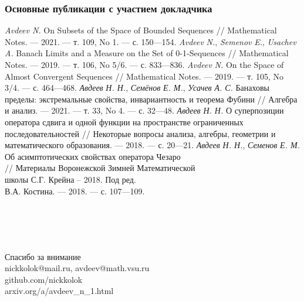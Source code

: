 \documentclass[10pt,pdf,hyperref={unicode},aspectratio=169,color={usenames, dvipsnames}]{beamer}\usepackage{amsmath}
\theoremstyle{definition}
\begin{document}
\begin{frame}
	\frametitle{Основные публикации с участием докладчика}
	\vspace{-1.2em}
	\hfill
	\begin{varwidth}[t]{0.95\linewidth}
	\setlength\itemsep{0pt}
	\begin{thebibliography}{99}
		\setlength{\parskip}{0pt}%
		\setlength{\itemsep}{0pt}
		{}
		\small
			\emph{Avdeev N.} On Subsets of the Space of Bounded Sequences // Mathematical Notes. — 2021. — т. 109, No 1. — с. 150—154.
			\mzm
		{}
		\vspace{-0.5em}
		\small
			\emph{Avdeev} \emph{N.}, \emph{Semenov} \emph{E.}, \emph{Usachev} \emph{A.} Banach Limits and a Measure on the Set of 0-1-Sequences //
			Mathematical Notes. — 2019. — т. 106, No 5/6. — с. 833—836.
			\mzm
		{}
		\vspace{-0.5em}
		\small
			\emph{Avdeev} \emph{N.} On the Space of Almost Convergent Sequences // Mathematical Notes. — 2019. — т. 105, No 3/4. — с. 464—468.
			\mzm
		{}
		\vspace{-0.5em}
		\small
			\emph{Авдеев} \emph{Н. Н.}, \emph{Семёнов} \emph{Е. М.}, \emph{Усачев} \emph{А. С.}
			Банаховы пределы: экстремальные свойства,
			инвариантность и теорема Фубини // Алгебра и анализ. — 2021. — т. 33, No 4. — с. 32—48.
			\vak
		{}
		\vspace{-0.5em}
		\footnotesize
			\emph{Авдеев} \emph{Н. Н.} О суперпозиции оператора сдвига и одной функции на пространстве ограниченных последовательностей //
			Некоторые вопросы анализа, алгебры, геометрии и математического образования. — 2018. — с. 20—21.
			\rinc
		{}
		\vspace{-0.6em}
		\footnotesize
			\emph{Авдеев} \emph{Н. Н.}, \emph{Семенов} \emph{Е. М.}
			Об асимптотических свойствах оператора Чезаро \\// Материалы Воронежской Зимней
			Математической\\школы С.Г. Крейна – 2018.  Под ред.\\В.А. Костина. — 2018. — с. 107—109.
			\rinc
	\end{thebibliography}
	\end{varwidth}
	\vspace{10em}
\end{frame}


\begin{frame}
	{
		\huge\centering
		~\\~\\~\\~\\
		Спасибо за внимание
	}
	~\\
	\vspace{6.28em}
	nickkolok@mail.ru, avdeev@math.vsu.ru
	\\
	github.com/nickkolok
	\\
	arxiv.org/a/avdeev\_n\_1.html
\end{frame}
\end{document}

